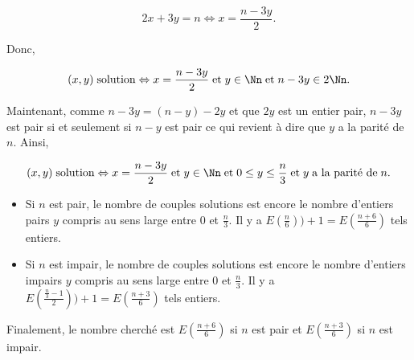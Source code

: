 {{$$2x+3y=n\Leftrightarrow x=\frac{n-3y}{2}.$$

Donc,

$$(x,y)\;\mbox{solution}\Leftrightarrow x=\frac{n-3y}{2}\;\mbox{et}\;y\in\Nn\;\mbox{et}\;n-3y\in2\Nn.$$

Maintenant, comme $n-3y=(n-y)-2y$ et que $2y$ est un entier pair, $n-3y$ est pair si et seulement si $n-y$ est pair ce
qui revient à dire que $y$ a la parité de $n$. Ainsi,

$$(x,y)\;\mbox{solution}\Leftrightarrow x=\frac{n-3y}{2}\;\mbox{et}\;y\in\Nn\;\mbox{et}\;0\leq y\leq
\frac{n}{3}\;\mbox{et}\;y\;\mbox{a la parité de}\;n.$$

\begin{itemize}
\item[\textbf{1er cas.}] Si $n$ est pair, le nombre de couples solutions est encore le nombre d'entiers pairs $y$
compris au sens large entre $0$ et $\frac{n}{3}$. Il y a $E(\frac{n}{6}))+1=E(\frac{n+6}{6})$ tels entiers.
\item[\textbf{2ème cas.}] Si $n$ est impair, le nombre de couples solutions est encore le nombre d'entiers impairs $y$
compris au sens large entre $0$ et $\frac{n}{3}$. Il y a  $E(\frac{\frac{n}{3}-1}{2}))+1=E(\frac{n+3}{6})$ tels
entiers.
\end{itemize}
Finalement, le nombre cherché est $E(\frac{n+6}{6})$ si $n$ est pair et $E(\frac{n+3}{6})$ si $n$ est impair.
}
}
